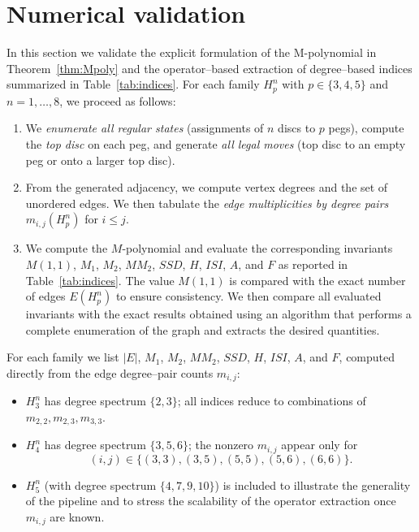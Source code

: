 \documentclass[letterpaper,12pt]{article}
\begin{document}
\section*{Numerical validation}\label{sec:numerical}

In this section we validate the explicit formulation of the M-polynomial in Theorem~\ref{thm:Mpoly} and the operator–based extraction of degree–based indices summarized in Table~\ref{tab:indices}. For each family $H_p^n$ with $p\in\{3,4,5\}$ and $n=1,\dots,8$, we proceed as follows:
\begin{enumerate}
  \item We \emph{enumerate all regular states} (assignments of $n$ discs to $p$ pegs), compute the \emph{top disc} on each peg, and generate \emph{all legal moves} (top disc to an empty peg or onto a larger top disc).
  \item From the generated adjacency, we compute vertex degrees and the set of unordered edges. We then tabulate the \emph{edge multiplicities by degree pairs} $m_{i,j}(H_p^n)$ for $i\le j$.
  \item We compute the \( M \)-polynomial and evaluate the corresponding invariants 
\( M(1,1) \), \( M_1 \), \( M_2 \), \( MM_2 \), \( SSD \), \( H \), \( ISI \), \( A \), and \( F \) 
as reported in Table~\ref{tab:indices}. 
The value \( M(1,1) \) is compared with the exact number of edges \( E(H_p^n) \) 
to ensure consistency. 
We then compare all evaluated invariants with the exact results obtained using 
an algorithm that performs a complete enumeration of the graph 
and extracts the desired quantities.

\end{enumerate}
 


 
For each family we list $|E|$, $M_1$, $M_2$, $MM_2$, $SSD$, $H$, $ISI$, $A$, and $F$, computed directly from the edge degree–pair counts $m_{i,j}$:
\begin{itemize}
  \item $H_3^n$ has degree spectrum $\{2,3\}$; all indices reduce to combinations of $m_{2,2},m_{2,3},m_{3,3}$.
  \item $H_4^n$ has degree spectrum $\{3,5,6\}$; the nonzero $m_{i,j}$ appear only for $$(i,j)\in\{(3,3),(3,5),(5,5),(5,6),(6,6)\}.$$
  \item $H_5^n$ (with degree spectrum $\{4,7,9,10\}$) is included to illustrate the generality of the pipeline and to stress the scalability of the operator extraction once $m_{i,j}$ are known.
\end{itemize}
\end{document}
